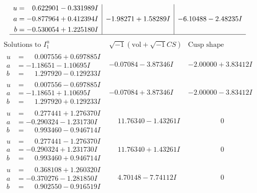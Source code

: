 \documentclass[1p]{elsarticle_modified}
\theoremstyle{definition}
\newcommand{\I}{\sqrt{-1}}
\begin{document}
$$\begin{array}{c|c|c}
\begin{aligned}
u &= \phantom{-}0.622901 - 0.331989 I \\
a &= -0.877964 + 0.412394 I \\
b &= -0.530054 + 1.225180 I\end{aligned}
 & -1.98271 + 1.58289 I & -6.10488 - 2.48235 I\\
 \hline 
 \end{array}$$\newpage$$\begin{array}{c|c|c}  
\text{Solutions to }I^u_{1}& \I (\text{vol} + \sqrt{-1}CS) & \text{Cusp shape}\\
 \hline 
\begin{aligned}
u &= \phantom{-}0.007556 + 0.697885 I \\
a &= -1.18651 - 1.10695 I \\
b &= \phantom{-}1.297920 - 0.129233 I\end{aligned}
 & -0.07084 - 3.87346 I & -2.00000 + 3.83412 I \\ \hline\begin{aligned}
u &= \phantom{-}0.007556 - 0.697885 I \\
a &= -1.18651 + 1.10695 I \\
b &= \phantom{-}1.297920 + 0.129233 I\end{aligned}
 & -0.07084 + 3.87346 I & -2.00000 - 3.83412 I \\ \hline\begin{aligned}
u &= \phantom{-}0.277441 + 1.276370 I \\
a &= -0.290324 - 1.231730 I \\
b &= \phantom{-}0.993460 - 0.946714 I\end{aligned}
 & \phantom{-}11.76340 - 1.43261 I & \phantom{-0.000000 } 0 \\ \hline\begin{aligned}
u &= \phantom{-}0.277441 - 1.276370 I \\
a &= -0.290324 + 1.231730 I \\
b &= \phantom{-}0.993460 + 0.946714 I\end{aligned}
 & \phantom{-}11.76340 + 1.43261 I & \phantom{-0.000000 } 0 \\ \hline\begin{aligned}
u &= \phantom{-}0.368108 + 1.260320 I \\
a &= -0.370276 - 1.281850 I \\
b &= \phantom{-}0.902550 - 0.916519 I\end{aligned}
 & \phantom{-}4.70148 - 7.74112 I & \phantom{-0.000000 } 0 \\ \hline\begin{aligned}

\end{aligned}
\end{array}$$
\end{document}
